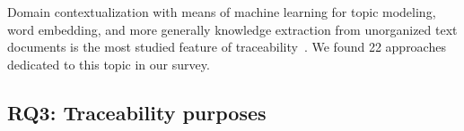 Domain contextualization with means of machine learning for topic modeling, word embedding, and more generally knowledge extraction from unorganized text documents is the most studied feature of traceability~\cite{guo2017-semantically-enhanced-tracebility-deep-learning,wohlrab2020-traceability-organization-process-culture}. We found 22 approaches dedicated to this topic in our survey. 



\subsection{RQ3: Traceability purposes}
\label{sec:traceablitypurposes}


%	
%	
%	
